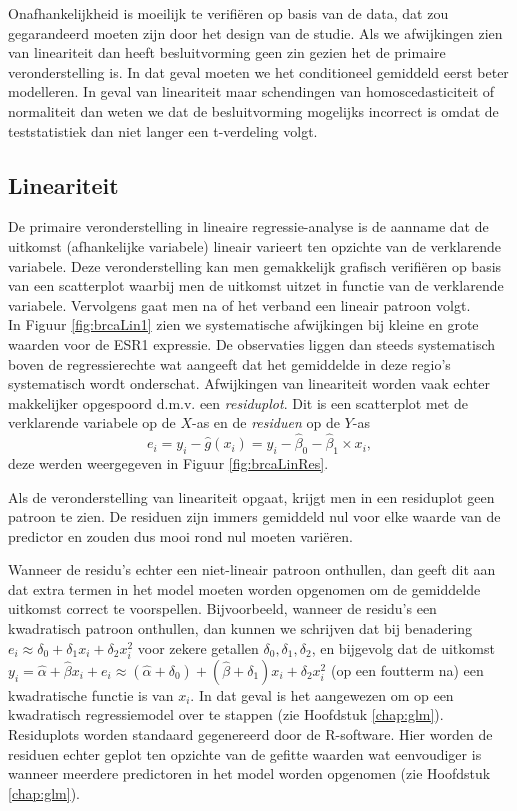 \documentclass[12pt,dutch,coursenotes]{book}
\theoremstyle{definition}
\theoremstyle{definition}
\theoremstyle{definition}
\theoremstyle{remark}
\begin{document}
Onafhankelijkheid is moeilijk te verifiëren op basis van de data, dat
zou gegarandeerd moeten zijn door het design van de studie. Als we
afwijkingen zien van lineariteit dan heeft besluitvorming geen zin
gezien het de primaire veronderstelling is. In dat geval moeten we het
conditioneel gemiddeld eerst beter modelleren. In geval van lineariteit
maar schendingen van homoscedasticiteit of normaliteit dan weten we dat
de besluitvorming mogelijks incorrect is omdat de teststatistiek dan
niet langer een t-verdeling volgt.

\subsection{Lineariteit}\label{lineariteit}

De primaire veronderstelling in lineaire regressie-analyse is de aanname
dat de uitkomst (afhankelijke variabele) lineair varieert ten opzichte
van de verklarende variabele. Deze veronderstelling kan men gemakkelijk
grafisch verifiëren op basis van een scatterplot waarbij men de uitkomst
uitzet in functie van de verklarende variabele. Vervolgens gaat men na
of het verband een lineair patroon volgt.\\
In Figuur \ref{fig:brcaLin1} zien we systematische afwijkingen bij
kleine en grote waarden voor de ESR1 expressie. De observaties liggen
dan steeds systematisch boven de regressierechte wat aangeeft dat het
gemiddelde in deze regio's systematisch wordt onderschat. Afwijkingen
van lineariteit worden vaak echter makkelijker opgespoord d.m.v. een
\emph{residuplot}. Dit is een scatterplot met de verklarende variabele
op de \(X\)-as en de \emph{residuen} op de \(Y\)-as
\[e_i=y_i-\hat{g}(x_i)=y_i-\hat\beta_0-\hat\beta_1\times x_i,\] deze
werden weergegeven in Figuur \ref{fig:brcaLinRes}.

Als de veronderstelling van lineariteit opgaat, krijgt men in een
residuplot geen patroon te zien. De residuen zijn immers gemiddeld nul
voor elke waarde van de predictor en zouden dus mooi rond nul moeten
variëren.

Wanneer de residu's echter een niet-lineair patroon onthullen, dan geeft
dit aan dat extra termen in het model moeten worden opgenomen om de
gemiddelde uitkomst correct te voorspellen. Bijvoorbeeld, wanneer de
residu's een kwadratisch patroon onthullen, dan kunnen we schrijven dat
bij benadering \(e_i\approx \delta_0+\delta_1 x_i+\delta_2 x_i^2\) voor
zekere getallen \(\delta_0,\delta_1,\delta_2\), en bijgevolg dat de
uitkomst
\(y_i=\hat{\alpha}+\hat{\beta}x_i+e_i\approx (\hat{\alpha}+\delta_0)+(\hat{\beta}+\delta_1)x_i+\delta_2 x_i^2\)
(op een foutterm na) een kwadratische functie is van \(x_i\). In dat
geval is het aangewezen om op een kwadratisch regressiemodel over te
stappen (zie Hoofdstuk \ref{chap:glm}). Residuplots worden standaard
gegenereerd door de R-software. Hier worden de residuen echter geplot
ten opzichte van de gefitte waarden wat eenvoudiger is wanneer meerdere
predictoren in het model worden opgenomen (zie Hoofdstuk
\ref{chap:glm}).
\end{document}

